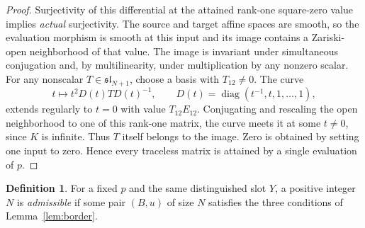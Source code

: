 \documentclass[11pt,reqno]{amsart}
\theoremstyle{definition}
\newtheorem{definition}[theorem]{Definition}
\begin{document}
\begin{proof}
Surjectivity of this differential at the attained rank-one square-zero value implies \emph{actual} surjectivity.  The source and target affine spaces are smooth, so the evaluation morphism is smooth at this input and its image contains a Zariski-open neighborhood of that value.  The image is invariant under simultaneous conjugation and, by multilinearity, under multiplication by any nonzero scalar.  For any nonscalar $T\in\mathfrak{sl}_{N+1}$, choose a basis with $T_{12}\ne0$.  The curve
\[
 t\longmapsto t^2D(t)T D(t)^{-1},\qquad
 D(t)=\operatorname{diag}(t^{-1},t,1,\ldots,1),
\]
extends regularly to $t=0$ with value $T_{12}E_{12}$.  Conjugating and rescaling the open neighborhood to one of this rank-one matrix, the curve meets it at some $t\ne0$, since $K$ is infinite.  Thus $T$ itself belongs to the image.  Zero is obtained by setting one input to zero.  Hence every traceless matrix is attained by a single evaluation of $p$.
\end{proof}

\begin{definition}\label{def:admissible}
For a fixed $p$ and the same distinguished slot $Y$, a positive integer $N$ is \emph{admissible} if some pair $(B,u)$ of size $N$ satisfies the three conditions of Lemma~\ref{lem:border}.
\end{definition}
\end{document}
